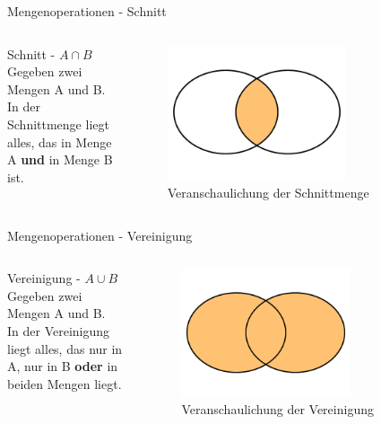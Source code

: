 \begin{frame}{Mengenoperationen - Schnitt}
\begin{columns}
    \begin{alertblock}{Schnitt - $A\cap B$}
    Gegeben zwei Mengen A und B.\\
    In der Schnittmenge liegt alles, das in Menge A \textbf{und} in Menge B ist.
    \end{alertblock}
\begin{figure}
    \centering
    \includegraphics[width=0.7\textwidth]{../figures/AundB.png}
    \caption{Veranschaulichung der Schnittmenge}
    \label{fig:my_label}
\end{figure}
\end{columns}
\end{frame}

\begin{frame}{Mengenoperationen - Vereinigung}
\begin{columns}
    \begin{alertblock}{Vereinigung - $A\cup B$}
    Gegeben zwei Mengen A und B.\\
    In der Vereinigung liegt alles, das nur in A, nur in B \textbf{oder} in beiden Mengen liegt.
    \end{alertblock}
\begin{figure}
    \centering
    \includegraphics[width=0.7\textwidth]{../figures/AoderB.png}
    \caption{Veranschaulichung der Vereinigung}
    \label{fig:my_label}
\end{figure}
\end{columns}
\end{frame}

